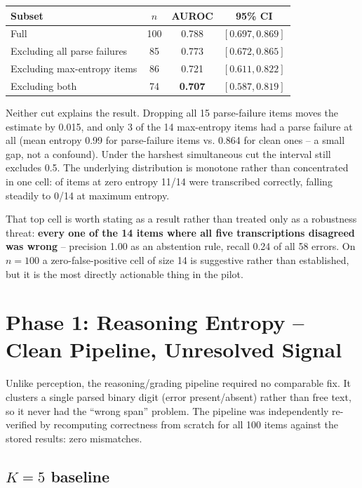 \documentclass[11pt]{article}
\begin{document}
\begin{center}
\begin{tabular}{lccc}
\toprule
Subset & $n$ & AUROC & 95\% CI \\
\midrule
Full & 100 & 0.788 & $[0.697, 0.869]$ \\
Excluding all parse failures & 85 & 0.773 & $[0.672, 0.865]$ \\
Excluding max-entropy items & 86 & 0.721 & $[0.611, 0.822]$ \\
Excluding both & 74 & \textbf{0.707} & $[0.587, 0.819]$ \\
\bottomrule
\end{tabular}
\end{center}

Neither cut explains the result. Dropping all 15 parse-failure items moves the
estimate by 0.015, and only 3 of the 14 max-entropy items had a parse failure
at all (mean entropy 0.99 for parse-failure items vs. 0.864 for clean ones --
a small gap, not a confound). Under the harshest simultaneous cut the interval
still excludes 0.5. The underlying distribution is monotone rather than
concentrated in one cell: of items at zero entropy 11/14 were transcribed
correctly, falling steadily to 0/14 at maximum entropy.

That top cell is worth stating as a result rather than treated only as a
robustness threat: \textbf{every one of the 14 items where all five
transcriptions disagreed was wrong} -- precision 1.00 as an abstention rule,
recall 0.24 of all 58 errors. On $n=100$ a zero-false-positive cell of size 14
is suggestive rather than established, but it is the most directly actionable
thing in the pilot.

\section{Phase 1: Reasoning Entropy -- Clean Pipeline, Unresolved Signal}
\label{sec:reasoning-pilot}

Unlike perception, the reasoning/grading pipeline required no comparable fix.
It clusters a single parsed binary digit (error present/absent) rather than
free text, so it never had the ``wrong span'' problem. The pipeline was
independently re-verified by recomputing correctness from scratch for all 100
items against the stored results: zero mismatches.

\subsection{$K=5$ baseline}
\end{document}
